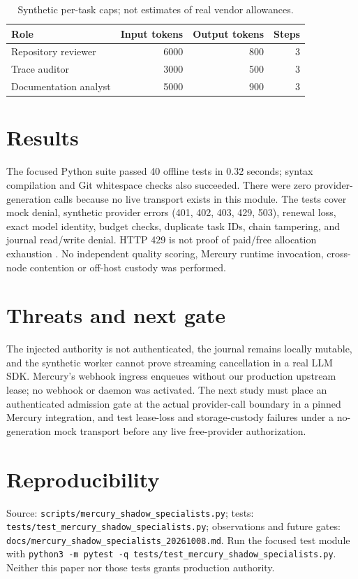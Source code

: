 \documentclass[11pt]{article}
\begin{document}
\begin{table}[h]
\centering
\caption{Synthetic per-task caps; not estimates of real vendor allowances.}
\begin{tabular}{lrrr}
\toprule
Role & Input tokens & Output tokens & Steps\\
\midrule
Repository reviewer & 6000 & 800 & 3\\
Trace auditor & 3000 & 500 & 3\\
Documentation analyst & 5000 & 900 & 3\\
\bottomrule
\end{tabular}
\end{table}

\section{Results}
The focused Python suite passed 40 offline tests in 0.32 seconds; syntax compilation and Git whitespace checks also succeeded. There were zero provider-generation calls because no live transport exists in this module. The tests cover mock denial, synthetic provider errors (401, 402, 403, 429, 503), renewal loss, exact model identity, budget checks, duplicate task IDs, chain tampering, and journal read/write denial. HTTP 429 is not proof of paid/free allocation exhaustion \cite{rfc6585}. No independent quality scoring, Mercury runtime invocation, cross-node contention or off-host custody was performed.

\section{Threats and next gate}
The injected authority is not authenticated, the journal remains locally mutable, and the synthetic worker cannot prove streaming cancellation in a real LLM SDK. Mercury's webhook ingress enqueues without our production upstream lease; no webhook or daemon was activated. The next study must place an authenticated admission gate at the actual provider-call boundary in a pinned Mercury integration, and test lease-loss and storage-custody failures under a no-generation mock transport before any live free-provider authorization.

\section{Reproducibility}
Source: \texttt{scripts/mercury\_shadow\_specialists.py}; tests: \texttt{tests/test\_mercury\_shadow\_specialists.py}; observations and future gates: \texttt{docs/mercury\_shadow\_specialists\_20261008.md}. Run the focused test module with \texttt{python3 -m pytest -q tests/test\_mercury\_shadow\_specialists.py}. Neither this paper nor those tests grants production authority.
\end{document}
